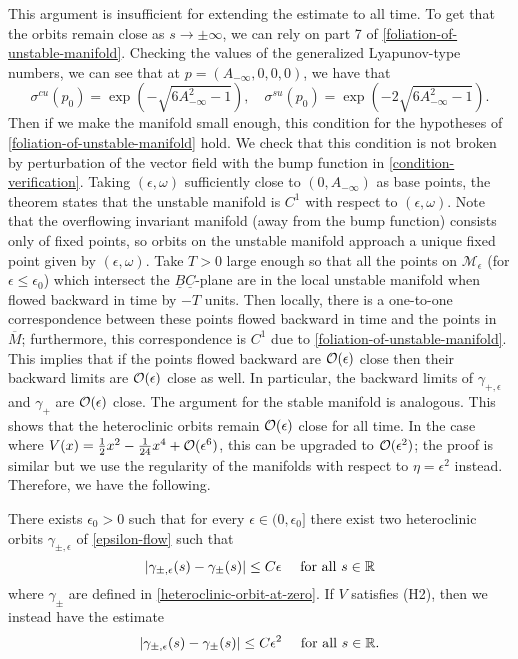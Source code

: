 This argument is insufficient for extending the estimate to all time. To get that the orbits remain close as \(s\to\pm\infty\), we can rely on part 7 of \cref{foliation-of-unstable-manifold}. Checking the values of the generalized Lyapunov-type numbers, we can see that at \(p = (A_{-\infty}, 0, 0, 0)\), we have that
\begin{equation*}
	\sigma^{cu}(p_0) = \exp(-\sqrt{6 A_{-\infty}^2 -1}), \quad \sigma^{su}(p_0) = \exp(-2\sqrt{6 A_{-\infty}^2 -1}).
\end{equation*}
Then if we make the manifold small enough, this condition for the hypotheses of \cref{foliation-of-unstable-manifold} hold. We check that this condition is not broken by perturbation of the vector field with the bump function in \cref{condition-verification}. Taking \((\epsilon, \omega)\) sufficiently close to \((0, A_{-\infty})\) as base points, the theorem states that the unstable manifold is \(C^1\) with respect to \((\epsilon, \omega)\). Note that the overflowing invariant manifold (away from the bump function) consists only of fixed points, so orbits on the unstable manifold approach a unique fixed point given by \((\epsilon, \omega)\). Take \(T> 0\) large enough so that all the points on \(\mathcal M_\epsilon\) (for \(\epsilon \leq \epsilon_0\)) which intersect the \(\underline B \underline C\)-plane are in the local unstable manifold when flowed backward in time by \(-T\) units. Then locally, there is a one-to-one correspondence between these points flowed backward in time and the points in \(\overline M\); furthermore, this correspondence is \(C^1\) due to \cref{foliation-of-unstable-manifold}. This implies that if the points flowed backward are \(\mathcal{O}(\epsilon)\) close then their backward limits are \(\mathcal{O}(\epsilon)\) close as well. In particular, the backward limits of \(\gamma_{+,\epsilon}\) and \(\gamma_+\) are \(\mathcal{O}(\epsilon)\) close. The argument for the stable manifold is analogous. This shows that the heteroclinic orbits remain \(\mathcal{O}(\epsilon)\) close for all time. In the case where \(V(x) = \frac 12 x^2 - \frac 1 {24} x^4 + \mathcal{O}(\epsilon^6)\), this can be upgraded to \(\mathcal{O}(\epsilon^2)\); the proof is similar but we use the regularity of the manifolds with respect to \(\eta = \epsilon^2\) instead. Therefore, we have the following.
\begin{prop}
	There exists \(\epsilon_0 > 0\) such that for every \(\epsilon\in(0,\epsilon_0]\) there exist two heteroclinic orbits \(\gamma_{\pm, \epsilon}\) of \cref{epsilon-flow} such that 
	\begin{equation*}
		|\gamma_{\pm,\epsilon}(s) - \gamma_\pm(s) | \leq C \epsilon \quad \text{ for all } s\in \mathbb{R}
	\end{equation*}
	where \(\gamma_{\pm}\) are defined in \cref{heteroclinic-orbit-at-zero}. If \(V\) satisfies (H2), then we instead have the estimate
	\begin{equation*}
		|\gamma_{\pm,\epsilon}(s) - \gamma_\pm(s) | \leq C \epsilon^2 \quad \text{ for all } s\in \mathbb{R}.
	\end{equation*}
\end{prop}

